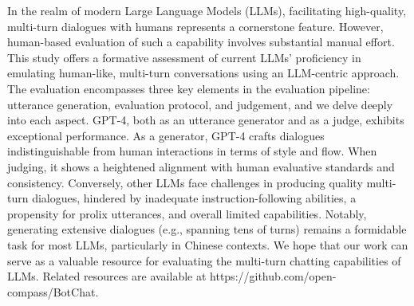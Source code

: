 In the realm of modern Large Language Models (LLMs), facilitating high-quality, multi-turn dialogues with humans represents a cornerstone feature. However, human-based evaluation of such a capability involves substantial manual effort. This study offers a formative assessment of current LLMs' proficiency in emulating human-like, multi-turn conversations using an LLM-centric approach. The evaluation encompasses three key elements in the evaluation pipeline: utterance generation, evaluation protocol, and judgement, and we delve deeply into each aspect. GPT-4, both as an utterance generator and as a judge, exhibits exceptional performance. As a generator, GPT-4 crafts dialogues indistinguishable from human interactions in terms of style and flow. When judging, it shows a heightened alignment with human evaluative standards and consistency. Conversely, other LLMs face challenges in producing quality multi-turn dialogues, hindered by inadequate instruction-following abilities, a propensity for prolix utterances, and overall limited capabilities. Notably, generating extensive dialogues (e.g., spanning tens of turns) remains a formidable task for most LLMs, particularly in Chinese contexts. We hope that our work can serve as a valuable resource for evaluating the multi-turn chatting capabilities of LLMs. Related resources are available at https://github.com/open-compass/BotChat.